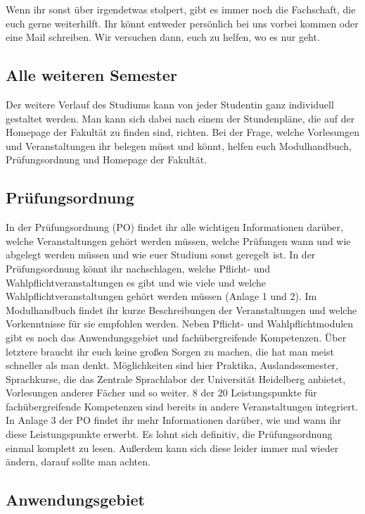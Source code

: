 Wenn ihr sonst über irgendetwas stolpert, gibt es immer noch die Fachschaft, die euch gerne weiterhilft. Ihr könnt entweder persönlich bei uns vorbei kommen oder eine Mail schreiben. Wir versuchen dann, euch zu helfen, wo es nur geht.

\subsection{Alle weiteren Semester}

Der weitere Verlauf des Studiums kann von jeder Studentin ganz individuell gestaltet werden. Man kann sich dabei nach einem der Stundenpläne, die auf der Homepage der Fakultät zu finden sind, richten. Bei der Frage, welche Vorlesungen und Veranstaltungen ihr belegen müsst und könnt, helfen euch Modulhandbuch, Prüfungsordnung und Homepage der Fakultät.

\subsection{Prüfungsordnung}

In der Prüfungsordnung (PO) findet ihr alle wichtigen Informationen darüber, welche Veranstaltungen gehört werden müssen, welche Prüfungen wann und wie abgelegt werden müssen und wie euer Studium sonst geregelt ist. In der Prüfungsordnung könnt ihr nachschlagen, welche Pflicht- und Wahlpflichtveranstaltungen es gibt und wie viele und welche Wahlpflichtveranstaltungen gehört werden müssen (Anlage 1 und 2).  Im Modulhandbuch findet ihr kurze Beschreibungen der Veranstaltungen und welche Vorkenntnisse für sie empfohlen werden. Neben Pflicht- und Wahlpflichtmodulen gibt es noch das Anwendungsgebiet und fachübergreifende Kompetenzen. Über letztere braucht ihr euch keine großen Sorgen zu machen, die hat man meist schneller als man denkt. Möglichkeiten sind hier Praktika, Auslandssemester, Sprachkurse, die das Zentrale Sprachlabor der Universität Heidelberg anbietet, Vorlesungen anderer Fächer und so weiter. 8 der 20 Leistungspunkte für fachübergreifende Kompetenzen sind bereits in andere Veranstaltungen integriert. In Anlage 3 der PO findet ihr mehr Informationen darüber, wie und wann ihr diese Leistungspunkte erwerbt. Es lohnt sich definitiv, die Prüfungsordnung einmal komplett zu lesen. Außerdem kann sich diese leider immer mal wieder ändern, darauf sollte man achten.

\subsection{Anwendungsgebiet}

